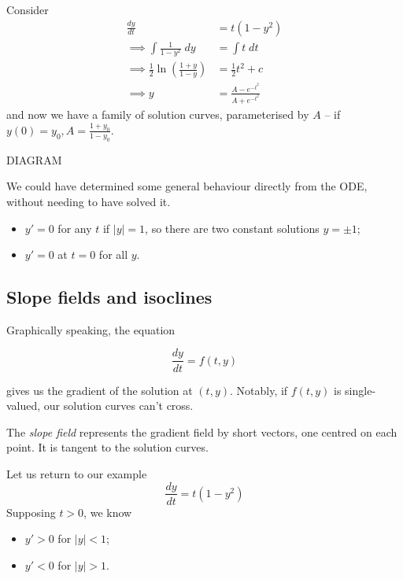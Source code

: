 \documentclass{../template/note}
\begin{document}
    \begin{example}
        Consider
        \begin{align*}
            \frac{dy}{dt} &= t(1-y^2) \\
            \implies \int \frac{1}{1-y^2} \; dy &= \int t \; dt \\
            \implies \frac 1 2 \ln \left( \frac{1+y}{1-y} \right) &= \frac 1 2 t^2 + c \\
            \implies y &= \frac{A - e^{-t^2}}{A + e^{-t^2}}
        \end{align*}
        and now we have a family of solution curves, parameterised by \(A\) -- if \(y(0) = y_0, A = \frac{1+y_0}{1-y_0}\).

        DIAGRAM

        We could have determined some general behaviour directly from the ODE, without needing to have solved it.

        \begin{itemize}
            \item \(y' = 0\) for any \(t\) if \(|y| = 1\), so there are two constant solutions \(y = \pm 1\);
            \item \(y' = 0\) at \(t = 0\) for all \(y\).
        \end{itemize}
    \end{example}
    

    \subsection{Slope fields and isoclines}

    Graphically speaking, the equation

    \[
        \frac{dy}{dt} = f(t, y)
    \]

    gives us the gradient of the solution at \((t, y)\). Notably, if \(f(t, y)\) is single-valued, our solution curves can't cross.

    \begin{definition}
        The \emph{slope field} represents the gradient field by short vectors, one centred on each point. It is tangent to the solution curves.
    \end{definition}
    
    \begin{example}
        Let us return to our example
        \[
            \frac{dy}{dt} = t(1-y^2)
        \]
        Supposing \(t > 0\), we know
        \begin{itemize}
            \item \(y' > 0\) for \(|y| < 1\);
            \item \(y' < 0\) for \(|y| > 1\).
        \end{itemize}
    \end{example}
    
\end{document}

